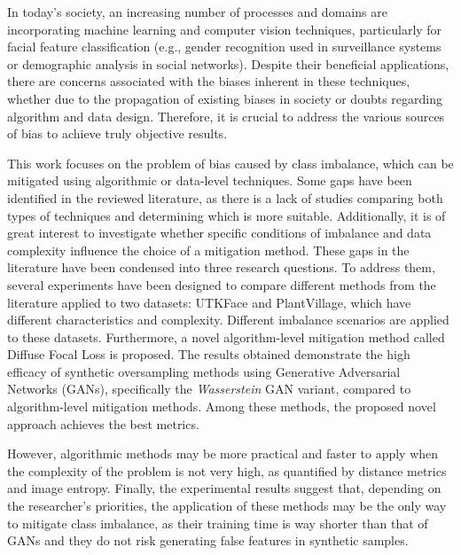 In today's society, an increasing number of processes and domains are incorporating machine learning and computer vision techniques, particularly for facial feature classification (e.g., gender recognition used in surveillance systems or demographic analysis in social networks). Despite their beneficial applications, there are concerns associated with the biases inherent in these techniques, whether due to the propagation of existing biases in society or doubts regarding algorithm and data design. Therefore, it is crucial to address the various sources of bias to achieve truly objective results.

This work focuses on the problem of bias caused by class imbalance, which can be mitigated using algorithmic or data-level techniques. Some gaps have been identified in the reviewed literature, as there is a lack of studies comparing both types of techniques and determining which is more suitable. Additionally, it is of great interest to investigate whether specific conditions of imbalance and data complexity influence the choice of a mitigation method. These gaps in the literature have been condensed into three research questions. To address them, several experiments have been designed to compare different methods from the literature applied to two datasets: UTKFace and PlantVillage, which have different characteristics and complexity. Different imbalance scenarios are applied to these datasets. Furthermore, a novel algorithm-level mitigation method called Diffuse Focal Loss is proposed. The results obtained demonstrate the high efficacy of synthetic oversampling methods using Generative Adversarial Networks (GANs), specifically the \textit{Wasserstein} GAN variant, compared to algorithm-level mitigation methods. Among these methods, the proposed novel approach achieves the best metrics.

However, algorithmic methods may be more practical and faster to apply when the complexity of the problem is not very high, as quantified by distance metrics and image entropy. Finally, the experimental results suggest that, depending on the researcher's priorities, the application of these methods may be the only way to mitigate class imbalance, as their training time is way shorter than that of GANs and they do not risk generating false features in synthetic samples.

